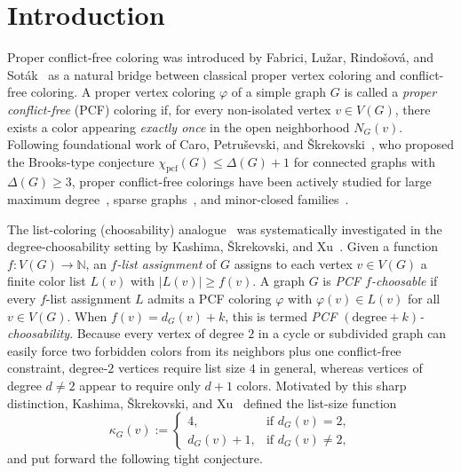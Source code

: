 \documentclass[11pt,a4paper]{article}
\theoremstyle{definition}
\newcommand{\N}{\mathbb{N}}
\begin{document}
\section{Introduction}\label{sec:intro}

Proper conflict-free coloring was introduced by Fabrici, Lu\v{z}ar, Rindo\v{s}ov\'a, and Sot\'ak~\cite{Fabrici2023} as a natural bridge between classical proper vertex coloring and conflict-free coloring. A proper vertex coloring $\varphi$ of a simple graph $G$ is called a \emph{proper conflict-free} (PCF) coloring if, for every non-isolated vertex $v \in V(G)$, there exists a color appearing \emph{exactly once} in the open neighborhood $N_G(v)$. Following foundational work of Caro, Petru\v{s}evski, and \v{S}krekovski~\cite{Caro2023}, who proposed the Brooks-type conjecture $\chi_{\mathrm{pcf}}(G) \le \Delta(G)+1$ for connected graphs with $\Delta(G) \ge 3$, proper conflict-free colorings have been actively studied for large maximum degree~\cite{CranstonLiu2024}, sparse graphs~\cite{Cho2025}, and minor-closed families~\cite{Liu2024}.

The list-coloring (choosability) analogue~\cite{Vizing1976,ErdosRubinTaylor1980} was systematically investigated in the degree-choosability setting by Kashima, \v{S}krekovski, and Xu~\cite{Kashima2025,Kashima2026}. Given a function $f : V(G) \to \N$, an \emph{$f$-list assignment} of $G$ assigns to each vertex $v \in V(G)$ a finite color list $L(v)$ with $|L(v)| \ge f(v)$. A graph $G$ is \emph{PCF $f$-choosable} if every $f$-list assignment $L$ admits a PCF coloring $\varphi$ with $\varphi(v) \in L(v)$ for all $v \in V(G)$. When $f(v) = d_G(v) + k$, this is termed \emph{PCF $(\mathrm{degree}+k)$-choosability}. Because every vertex of degree $2$ in a cycle or subdivided graph can easily force two forbidden colors from its neighbors plus one conflict-free constraint, degree-$2$ vertices require list size $4$ in general, whereas vertices of degree $d \neq 2$ appear to require only $d+1$ colors. Motivated by this sharp distinction, Kashima, \v{S}krekovski, and Xu~\cite{Kashima2025} defined the list-size function
\begin{equation}\label{eq:kappa}
  \kappa_G(v) := \begin{cases}
    4, & \text{if } d_G(v) = 2,\\
    d_G(v) + 1, & \text{if } d_G(v) \neq 2,
  \end{cases}
\end{equation}
and put forward the following tight conjecture.
\end{document}
